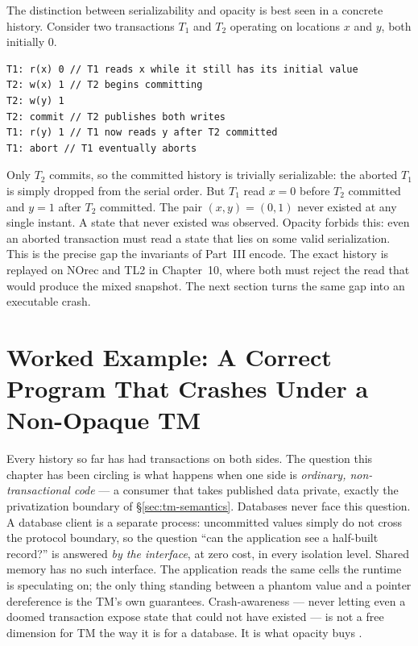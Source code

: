 The distinction between serializability and opacity is best seen in a concrete
history. Consider two transactions $T_1$ and $T_2$ operating on locations $x$
and $y$, both initially $0$.

\begin{lstlisting}[caption={A serializable-but-not-opaque history. Only
$T_2$ commits, but the aborted $T_1$ observed the never-existent state
$(x,y)=(0,1)$.}, label={lst:serializable-not-opaque}]
T1: r(x) 0 // T1 reads x while it still has its initial value
T2: w(x) 1 // T2 begins committing
T2: w(y) 1
T2: commit // T2 publishes both writes
T1: r(y) 1 // T1 now reads y after T2 committed
T1: abort // T1 eventually aborts
\end{lstlisting}

Only $T_2$ commits, so the committed history is trivially serializable: the
aborted $T_1$ is simply dropped from the serial order. But $T_1$ read $x=0$
before $T_2$ committed and $y=1$ after $T_2$ committed. The pair
$(x,y)=(0,1)$ never existed at any single instant. A state that never existed
was observed. Opacity forbids this: even an aborted transaction must read a
state that lies on some valid serialization. This is the precise gap the
invariants of Part~III encode. The exact history is replayed on NOrec and TL2
in Chapter~10, where both must reject the read that would produce the mixed
snapshot. The next section turns the same gap into an executable crash.

\section{Worked Example: A Correct Program That Crashes Under a Non-Opaque TM}
\label{sec:crash-without-opacity}

Every history so far has had transactions on both sides. The question this
chapter has been circling is what happens when one side is \emph{ordinary,
non-transactional code} --- a consumer that takes published data private,
exactly the privatization boundary of \S\ref{sec:tm-semantics}. Databases
never face this question. A database client is a separate process: uncommitted
values simply do not cross the protocol boundary, so the question ``can the
application see a half-built record?'' is answered \emph{by the interface}, at
zero cost, in every isolation level. Shared memory has no such interface. The
application reads the same cells the runtime is speculating on; the only thing
standing between a phantom value and a pointer dereference is the TM's own
guarantees. Crash-awareness --- never letting even a doomed transaction expose
state that could not have existed --- is not a free dimension for TM the way
it is for a database. It is what opacity buys \cite{guerraoui08correctness}.

